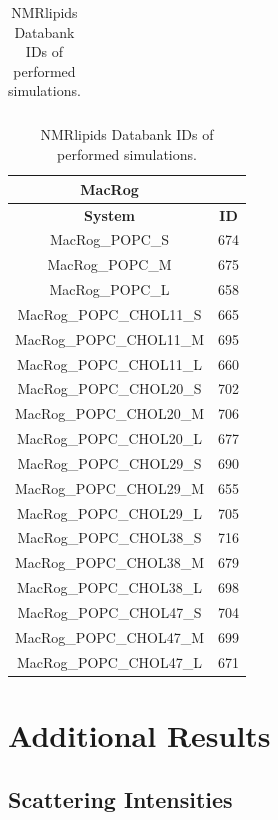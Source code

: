 \documentclass[journal=jpcbfk,manuscript=suppinfo]{achemso}
\begin{document}
\begin{table}[]
\begin{small}
\begin{tabular}{cc}
\bottomrule
\end{tabular}
\quad
\begin{tabular}{cc}
\textbf{MacRog} \\
\toprule
\textbf{System} & \textbf{ID} \\
\midrule
MacRog\_POPC\_S  &  674 \\ 
MacRog\_POPC\_M  &  675 \\ 
MacRog\_POPC\_L  &  658 \\ 
\midrule
MacRog\_POPC\_CHOL11\_S  &  665 \\ 
MacRog\_POPC\_CHOL11\_M  &  695 \\ 
MacRog\_POPC\_CHOL11\_L  &  660 \\ 
\midrule
MacRog\_POPC\_CHOL20\_S  &  702 \\
MacRog\_POPC\_CHOL20\_M  &  706 \\ 
MacRog\_POPC\_CHOL20\_L  &  677 \\ 
\midrule
MacRog\_POPC\_CHOL29\_S  &  690 \\ 
MacRog\_POPC\_CHOL29\_M  &  655 \\ 
MacRog\_POPC\_CHOL29\_L  &  705 \\ 
\midrule
MacRog\_POPC\_CHOL38\_S  &  716 \\ 
MacRog\_POPC\_CHOL38\_M  &  679 \\ 
MacRog\_POPC\_CHOL38\_L  &  698 \\ 
\midrule
MacRog\_POPC\_CHOL47\_S  &  704 \\ 
MacRog\_POPC\_CHOL47\_M  &  699 \\ 
MacRog\_POPC\_CHOL47\_L  &  671 \\ 
\bottomrule
\end{tabular}
\caption{NMRlipids Databank IDs of performed simulations.}\label{IDtable}
\end{small}
\end{table}

\clearpage

\section{Additional Results}

\subsection{Scattering Intensities}
\end{document}
